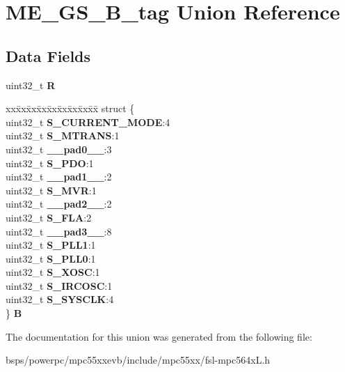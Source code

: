 \hypertarget{unionME__GS__32B__tag}{}\section{M\+E\+\_\+\+G\+S\+\_\+B\+\_\+tag Union Reference}
\label{unionME__GS__32B__tag}
\subsection*{Data Fields}
\begin{DoxyCompactItemize}
\item 
\mbox{\label{unionME__GS__32B__tag_ada6cfd8402038e07354056937fd35c34}} 
uint32\+\_\+t {\bfseries R}
\item 
\mbox{\label{unionME__GS__32B__tag_a7f3d85eaa0b19808623016a537a43317}} 
\begin{tabbing}
xx\=xx\=xx\=xx\=xx\=xx\=xx\=xx\=xx\=\kill
struct \{\\
\>uint32\_t {\bfseries S\_CURRENT\_MODE}:4\\
\>uint32\_t {\bfseries S\_MTRANS}:1\\
\>uint32\_t {\bfseries \_\_pad0\_\_}:3\\
\>uint32\_t {\bfseries S\_PDO}:1\\
\>uint32\_t {\bfseries \_\_pad1\_\_}:2\\
\>uint32\_t {\bfseries S\_MVR}:1\\
\>uint32\_t {\bfseries \_\_pad2\_\_}:2\\
\>uint32\_t {\bfseries S\_FLA}:2\\
\>uint32\_t {\bfseries \_\_pad3\_\_}:8\\
\>uint32\_t {\bfseries S\_PLL1}:1\\
\>uint32\_t {\bfseries S\_PLL0}:1\\
\>uint32\_t {\bfseries S\_XOSC}:1\\
\>uint32\_t {\bfseries S\_IRCOSC}:1\\
\>uint32\_t {\bfseries S\_SYSCLK}:4\\
\} {\bfseries B}\\

\end{tabbing}\end{DoxyCompactItemize}


The documentation for this union was generated from the following file\+:\begin{DoxyCompactItemize}
\item 
bsps/powerpc/mpc55xxevb/include/mpc55xx/fsl-\/mpc564x\+L.\+h\end{DoxyCompactItemize}
